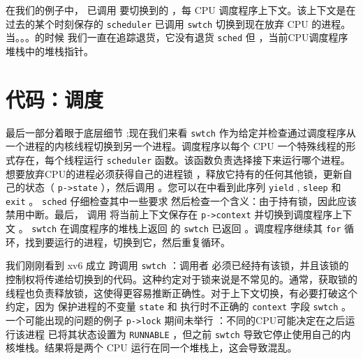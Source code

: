 \documentclass[UTF8]{article}
\begin{document}
在我们的例子中，
 已调用       
 要切换到的       
        ，每 CPU 调度程序上下文。该上下文是在过去的某个时刻保存的
    \lstinline{scheduler}    已调用
    \lstinline{swtch}   
        切换到现在放弃 CPU 的进程。当。。。的时候
       我们一直在追踪退货，它没有退货
    \lstinline{sched}    但
        ，当前CPU调度程序堆栈中的堆栈指针。
    \section{代码：调度  }     

最后一部分着眼于底层细节
        ;现在我们来看
    \lstinline{swtch}    作为给定并检查通过调度程序从一个进程的内核线程切换到另一个进程。调度程序以每个 CPU 一个特殊线程的形式存在，每个线程运行
    \lstinline{scheduler}    函数。该函数负责选择接下来运行哪个进程。想要放弃CPU的进程必须获得自己的进程锁
        ，释放它持有的任何其他锁，更新自己的状态（    \lstinline{p->state}    ），然后调用
        。您可以在中看到此序列
    \lstinline{yield}   
        ,
    \texttt{sleep}    和
    \texttt{exit}    。
    \lstinline{sched}    仔细检查其中一些要求
        然后检查一个含义：由于持有锁，因此应该禁用中断。最后，
        调用
        将当前上下文保存在
    \lstinline{p->context}    并切换到调度程序上下文
        。
    \lstinline{swtch}    在调度程序的堆栈上返回
        的
    \lstinline{swtch}    已返回
        。调度程序继续其
    \lstinline{for}   循环，找到要运行的进程，切换到它，然后重复循环。  

我们刚刚看到 xv6 成立
        跨调用
    \lstinline{swtch}    ：调用者
        必须已经持有该锁，并且该锁的控制权将传递给切换到的代码。这种约定对于锁来说是不常见的。通常，获取锁的线程也负责释放锁，这使得更容易推断正确性。对于上下文切换，有必要打破这个约定，因为
        保护进程的不变量
    \lstinline{state}    和
 执行时不正确的    \lstinline{context}    字段
    \lstinline{swtch}    。一个可能出现的问题的例子
    \lstinline{p->lock}    期间未举行
       ：不同的CPU可能决定在之后运行该进程
        已将其状态设置为
    \lstinline{RUNNABLE}    ，但之前
    \lstinline{swtch}    导致它停止使用自己的内核堆栈。结果将是两个 CPU 运行在同一个堆栈上，这会导致混乱。  
\end{document}
